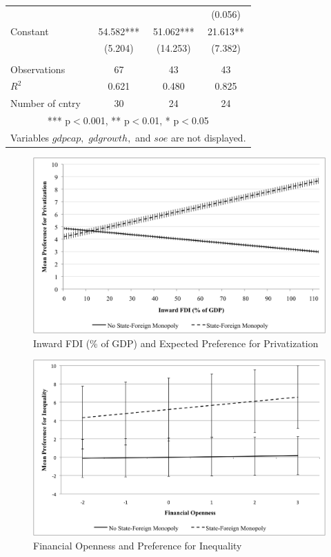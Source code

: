 \documentclass[12pt]{report}
\begin{document}
\begin{center}
\begin{table}
{\begin{tabular}{lccc}
 &  &  & (0.056) \\
Constant & 54.582*** & 51.062*** & 21.613** \\
 & (5.204) & (14.253) & (7.382) \\
 &  &  &  \\
Observations & 67 & 43 & 43 \\
$R^2$ & 0.621 & 0.480 & 0.825 \\
Number of cntry & 30 & 24 & 24 \\
\multicolumn{4}{c}{ *** p$<$0.001, ** p$<$0.01, * p$<$0.05} \\
\multicolumn{4}{c}{Variables $gdpcap,$ $gdgrowth,$ and $soe$ are not displayed.}\\
\end{tabular}
}
\label{default}
\end{table}
\end{center}
\doublespace

\begin{figure}[htbp]
\begin{center}
\includegraphics[scale=.75]{article3_fdi.png}
\caption{{Inward FDI (\% of GDP) and Expected Preference for Privatization}}
\end{center}
\end{figure}

\begin{figure}[htbp]
\begin{center}
\includegraphics[scale=.75]{article3_finopen.png}
\caption{{Financial Openness and Preference for Inequality}}
\end{center}
\end{figure}
\end{document}
